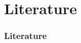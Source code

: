 \documentclass[a4paper,10pt,handout]{beamer}
\begin{document}
\begin{frame}[allowframebreaks]
{\begin{itemize}

%		
%		
%		
%		

\end{itemize}
}

\end{frame}


\section{Literature}

\begin{frame}[allowframebreaks]
\frametitle{Literature}

%	

%	 
 

{\footnotesize

}	
\end{frame}

\backupend
\end{document}
